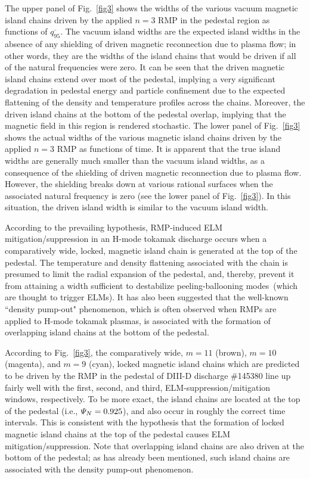 \documentclass[12pt,prb,aps]{revtex4-1}
\begin{document}
The upper panel of Fig.~\ref{fig3} shows the widths of the various vacuum magnetic island chains driven by the applied $n=3$ RMP in the pedestal region as functions of $
\overline{q_{95}}$.
The vacuum island widths are the  expected island widths in the absence of any shielding of driven magnetic reconnection due to
plasma flow; in other words, they are the  widths of the island chains that would be driven if all of the natural frequencies were zero. It can be seen that
the driven magnetic island chains extend over most of the pedestal, implying a very significant degradation in pedestal energy and particle confinement due to the
expected flattening of the density and temperature profiles across the chains.\cite{flat} Moreover, the driven island chains at the
bottom of the pedestal overlap, implying that the magnetic field in this region is rendered stochastic. The lower panel
of Fig.~\ref{fig3} shows the actual widths of the various magnetic island chains driven by the applied $n=3$ RMP as functions of time. It is apparent 
that the true island widths are generally much smaller than the vacuum island widths, as a consequence of the shielding of driven magnetic
reconnection due to plasma flow. However, the shielding breaks down at various rational surfaces when the associated natural frequency is zero (see the lower panel of
Fig.~\ref{fig3}). In this situation, the driven island width is similar to the vacuum island width.

According to the prevailing hypothesis, RMP-induced ELM mitigation/suppression in an H-mode tokamak discharge occurs when a comparatively wide, locked, magnetic
island chain is generated at the top of the pedestal.\cite{hu} The temperature and density flattening associated with the chain
is presumed to limit the radial expansion of the
pedestal, and, thereby, prevent it from attaining a width sufficient to destabilize peeling-ballooning modes\,\cite{connor}  (which are thought to trigger ELMs).\cite{d3d}
It has also been suggested that  the well-known ``density pump-out" phenomenon, which is often observed when RMPs are applied
to H-mode tokamak plasmas, is associated with the formation of overlapping island chains
at the bottom of the pedestal.\cite{hu}

According to Fig.~\ref{fig3},  
 the comparatively wide, $m=11$ (brown),  $m=10$ (magenta), and  $m=9$ (cyan), locked magnetic island chains which are predicted to be driven by the RMP in the pedestal of DIII-D discharge \#145380 line up
fairly well with the first, second, and third, ELM-suppression/mitigation windows, respectively. To be more exact, the island chains are located at
the top of the pedestal (i.e., ${\mit\Psi}_N=0.925$), and also occur in roughly the correct time intervals. This is consistent with the hypothesis that the formation of locked
magnetic island chains at the top of the pedestal causes ELM mitigation/suppression. 
Note that overlapping island chains
are also driven at the bottom of the pedestal; as has already been mentioned, such island chains are associated with the density pump-out phenomenon. 
\end{document}
